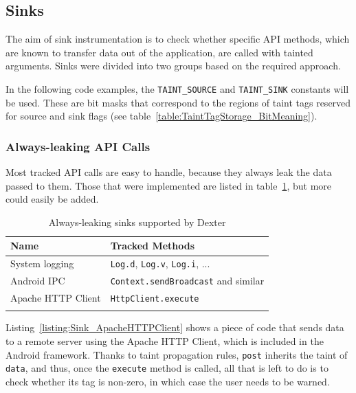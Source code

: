 \documentclass[12pt,twoside,notitlepage]{report}
\begin{document}
\subsection{Sinks}

The aim of sink instrumentation is to check whether specific API methods, which are known to transfer data out of the application, are called with tainted arguments. Sinks were divided into two groups based on the required approach.

In the following code examples, the \verb$TAINT_SOURCE$ and \verb$TAINT_SINK$ constants will be used. These are bit masks that correspond to the regions of taint tags reserved for source and sink flags (see table~\ref{table:TaintTagStorage_BitMeaning}).

\subsubsection{Always-leaking API Calls}

Most tracked API calls are easy to handle, because they always leak the data passed to them. Those that were implemented are listed in table~\ref{table:Sinks_AlwaysLeaking}, but more could easily be added.

\begin{table}[h]
	\begin{center}
	\begin{tabular}{|l|l|}
		\firsthline
		\textbf{Name}         & \textbf{Tracked Methods} \\
		\hline
		System logging        & \verb$Log.d$, \verb$Log.v$, \verb$Log.i$, ... \\
		Android IPC           & \verb$Context.sendBroadcast$ and similar \\
		Apache HTTP Client    & \verb$HttpClient.execute$ \\
		\lasthline
	\end{tabular}
	\end{center}
	\caption{Always-leaking sinks supported by Dexter}
	\label{table:Sinks_AlwaysLeaking}
\end{table}

Listing~\ref{listing:Sink_ApacheHTTPClient} shows a piece of code that sends data to a remote server using the Apache HTTP Client, which is included in the Android framework. Thanks to taint propagation rules, \verb$post$ inherits the taint of \verb$data$, and thus, once the \verb$execute$ method is called, all that is left to do is to check whether its tag is non-zero, in which case the user needs to be warned.
\end{document}
